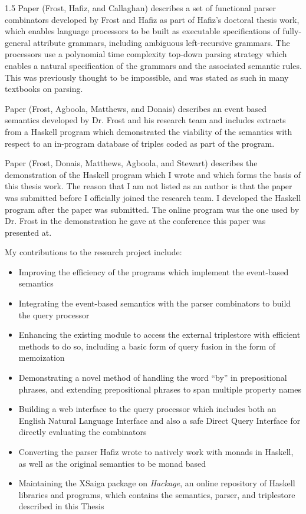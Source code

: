 \documentclass[fleqn, oneside, 12pt]{book}
\theoremstyle{definitionsty}
\newcommand{\uwinonehalfspacelen}{1.5}
\newcommand{\uwindefaultspacelen}{\uwinonehalfspacelen}
\newenvironment{uwindefaultspaceenv}%
{\begin{spacing}{\uwindefaultspacelen}}%
	{\end{spacing}}
\begin{document}
\begin{uwindefaultspaceenv}
	Paper \cite{frosthafiz2008} (Frost, Hafiz, and Callaghan) describes a set of functional parser combinators developed by Frost and Hafiz as part of Hafiz's doctoral thesis work, which enables language processors to be built as executable specifications of fully-general attribute grammars, including ambiguous left-recursive grammars.  The processors use a polynomial time complexity top-down parsing strategy which enables a natural specification of the grammars and the associated semantic rules.  This was previously thought to be impossible, and was stated as such in many textbooks on parsing.
	
	Paper \cite{frostagboola2014} (Frost, Agboola, Matthews, and Donais) describes an event based semantics developed by Dr. Frost and his research team and includes extracts from a Haskell program which demonstrated the viability of the semantics with respect to an in-program database of triples coded as part of the program.
	
	Paper \cite{frost2014demonstration} (Frost, Donais, Matthews, Agboola, and Stewart) describes the demonstration of the Haskell program which I wrote and which forms the basis of this thesis work.  The reason that I am not listed as an author is that the paper was submitted before I officially joined the research team.  I developed the Haskell program after the paper was submitted.  The online program was the one used by Dr. Frost in the demonstration he gave at the conference this paper was presented at.
	
	My contributions to the research project include:
	
	\begin{itemize}
		\item Improving the efficiency of the programs which implement the event-based semantics
		\item Integrating the event-based semantics with the parser combinators to build the query processor
		\item Enhancing the existing module to access the external triplestore with efficient methods to do so, including a basic form of query fusion in the form of memoization
		\item Demonstrating a novel method of handling the word ``by'' in prepositional phrases, and extending prepositional phrases to span multiple property names
		\item Building a web interface to the query processor which includes both an English Natural Language Interface and also a safe Direct Query Interface for directly evaluating the combinators
		\item Converting the parser Hafiz wrote\cite{frosthafiz2008} to natively work with monads in Haskell, as well as the original semantics\cite{frost2014demonstration} to be monad based
		\item Maintaining the XSaiga package on {\em Hackage}\cite{XSaiga:2016}, an online repository of Haskell libraries and programs, which contains the semantics, parser, and triplestore described in this Thesis
	\end{itemize}
	

\end{uwindefaultspaceenv}
\end{document}
